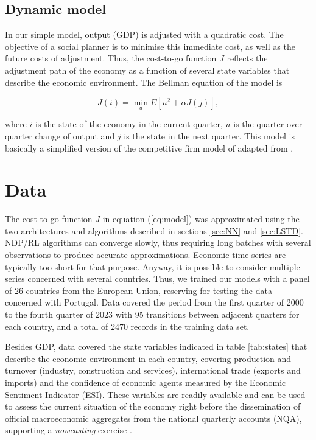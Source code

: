 \subsection{Dynamic model}
\label{sec:model}

In our simple model, output (GDP) is adjusted with a quadratic cost. The objective of a social planner is to minimise this immediate cost, as well as the future costs of adjustment. Thus, the cost-to-go function $J$ reflects the adjustment path of the economy as a function of several state variables that describe the economic environment. The Bellman equation of the model is 

\begin{equation}
	J(i) = \min_{u} E \left[ u^2 + \alpha J(j)\right],
	\label{eq:model}
\end{equation}

\noindent where $i$ is the state of the economy in the current quarter, $u$ is the quarter-over-quarter change of output and $j$ is the state in the next quarter. This model is basically a simplified version of the competitive firm model of \citet[section 7.2]{Ljungqvist2018} adapted from \citet{LucasJr.1971}.


\section{Data}
\label{sec:data}

The cost-to-go function $J$ in equation (\ref{eq:model}) was approximated using the two architectures and algorithms described in sections \ref{sec:NN} and \ref{sec:LSTD}. NDP/RL algorithms can converge slowly, thus requiring long batches with several observations to produce accurate approximations. Economic time series are typically too short for that purpose. Anyway, it is possible to consider multiple series concerned with several countries. Thus, we trained our models with a panel of 26 countries from the European Union, reserving for testing the data concerned with Portugal. Data covered the period from the first quarter of 2000 to the fourth quarter of 2023 with 95 transitions between adjacent quarters for each country, and a total of 2470 records in the training data set. 

Besides GDP, data covered the state variables indicated in table \ref{tab:states} that describe the economic environment in each country, covering production and turnover (industry, construction and services), international trade (exports and imports) and the confidence of economic agents measured by the Economic Sentiment Indicator (ESI). These variables are readily available and can be used to assess the current situation of the economy right before the dissemination of official macroeconomic aggregates from the national quarterly accounts (NQA), supporting a \emph{nowcasting} exercise \citep{Baffigi2004,Giannone2008}.     

